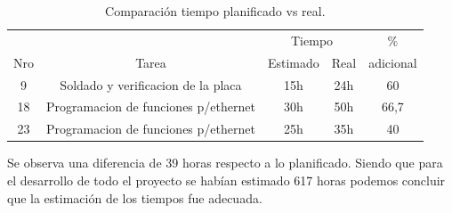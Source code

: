 \begin{table}[hp]
  \begin{tabular}{|c|c|c|c|c|}
    \hline
       &       & \multicolumn{2}{c|}{ Tiempo} & \%  \\ \cline{3-4}
    Nro& Tarea &       Estimado &  Real       & adicional \\
    \hline
    9 & Soldado y verificacion de la placa & 15h & 24h & 60 \\
    18 & Programacion de funciones p/ethernet & 30h & 50h & 66,7 \\
    23 & Programacion de funciones p/ethernet & 25h & 35h & 40 \\
    \hline \hline
  \end{tabular}
  \caption{Comparación tiempo planificado vs real.}
  \label{tab:update_task}
\end{table}

Se observa una diferencia de 39 horas respecto a lo planificado. Siendo que para el desarrollo de todo el proyecto se habían estimado 617 horas podemos concluir que la estimación de los tiempos fue adecuada. 


